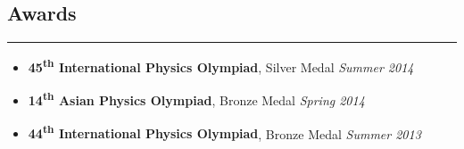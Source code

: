 \documentclass[10pt]{article}
\begin{document}
\subsection*{Awards}
\vspace*{-\baselineskip}
\noindent\rule{\linewidth}{0.4pt}

\begin{itemize}
    \item \textbf{45\textsuperscript{th} International Physics Olympiad}, Silver Medal \hfill \emph{Summer 2014}
    \item \textbf{14\textsuperscript{th} Asian Physics Olympiad}, Bronze Medal \hfill \emph{Spring 2014}
    \item \textbf{44\textsuperscript{th} International Physics Olympiad}, Bronze Medal \hfill \emph{Summer 2013}
\end{itemize}
\end{document}
